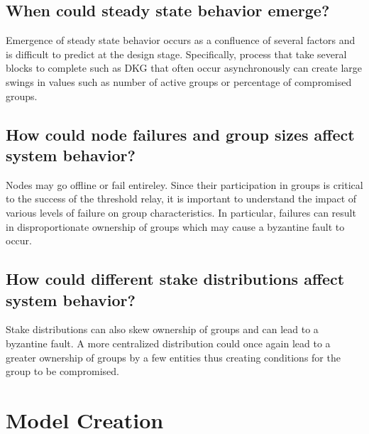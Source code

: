 \documentclass[conference]{IEEEtran}
\begin{document}
\subsection{When could steady state behavior emerge?}
Emergence of steady state behavior occurs as a confluence of several factors and is difficult
to predict at the design stage. Specifically, process that take several blocks to complete 
such as DKG that often occur asynchronously can create large swings in values such as number of active
groups or percentage of compromised groups. 

\subsection{How could node failures and group sizes affect system behavior?}
Nodes may go offline or fail entireley. Since their participation in groups is critical to the 
success of the threshold relay, it is important to understand the impact of various levels
of failure on group characteristics. In particular, failures can result in disproportionate ownership
of groups which may cause a byzantine fault to occur. 

\subsection{How could different stake distributions affect system behavior?}
Stake distributions can also skew ownership of groups and can lead to a byzantine fault. A more
centralized distribution could once again lead to a greater ownership of groups by a few entities
thus creating conditions for the group to be compromised. 

\section{Model Creation}
\end{document}
